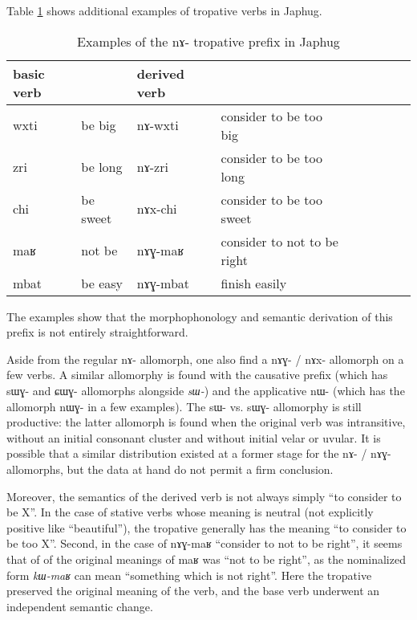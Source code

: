 \documentclass[oldfontcommands,oneside,a4paper,11pt]{article}
\newcommand{\ipa}[1]{{\phon #1}} %
\begin{document}
Table \ref{tab:tropative}  shows additional examples of tropative verbs in Japhug.
\begin{table}[H]
\caption{Examples of the \ipa{nɤ}- tropative prefix in Japhug}\label{tab:tropative}
\begin{tabular}{lllllllll} \toprule
basic verb  & &derived  verb &\\
\midrule
 \ipa{wxti} & be big & \ipa{nɤ-wxti} & consider to be too big \\
 \ipa{zri} & be long & \ipa{nɤ-zri} & consider to be too long \\
       \midrule
  \ipa{chi} &be sweet & \ipa{nɤx-chi}  &consider to be too sweet \\
  \ipa{maʁ} & not be & \ipa{nɤɣ-maʁ} & consider to not to be right \\
  \ipa{mbat} & be easy & \ipa{nɤɣ-mbat} & finish easily \\
\bottomrule
\end{tabular}
\end{table}
The examples show that the morphophonology and semantic derivation of this prefix is not entirely straightforward.

Aside from the regular \ipa{nɤ-} allomorph, one also find a \ipa{nɤɣ-} / \ipa{nɤx-} allomorph on a few verbs. A similar allomorphy is found with the causative prefix (which has \ipa{sɯɣ-} and \ipa{ɕɯɣ-} allomorphs alongside \textit{sɯ-}) and the applicative \ipa{nɯ-} (which has the allomorph \ipa{nɯɣ-} in a few examples). The  \ipa{sɯ-} vs. \ipa{sɯɣ-} allomorphy is still productive: the latter allomorph is found when the original verb was intransitive, without an initial consonant cluster and without initial velar or uvular. It is possible that a similar distribution existed at a former stage for the \ipa{nɤ-} / \ipa{nɤɣ-} allomorphs, but the data at hand do not permit a firm conclusion.

Moreover, the semantics of the derived verb is not always simply ``to consider to be X''. In the case of stative verbs whose meaning is neutral (not explicitly positive like ``beautiful''), the tropative generally has the meaning ``to consider to be too X''. Second, in the case of \ipa{nɤɣ-maʁ} ``consider to not to be right'', it seems that of of the original meanings of   \ipa{maʁ}  was ``not to be right'', as the nominalized form \textit{kɯ-maʁ} can mean ``something which is not right''. Here the tropative preserved the original meaning of the verb, and the base verb underwent an independent semantic change.
\end{document}
